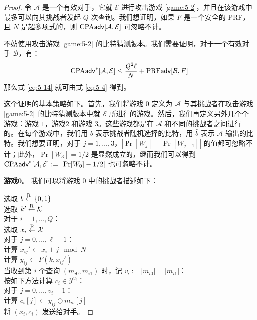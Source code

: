 \begin{proof}
令 $\mathcal{A}$ 是一个有效对手，它就 $\mathcal{E}$ 进行攻击游戏 \ref{game:5-2}，并且在该游戏中最多可以向其挑战者发起 $Q$ 次查询。我们想证明，如果 $F$ 是一个安全的 PRF，且 $N$ 是超多项式的，则 ${\rm CPA}\mathsf{adv}[\mathcal{A},\mathcal{E}]$ 可忽略不计。

不妨使用攻击游戏 \ref{game:5-2} 的比特猜测版本。我们需要证明，对于一个有效对手 $\mathcal{B}$，有：
\begin{equation}\label{eq:5-15}
{\rm CPA}\mathsf{adv}^*[\mathcal{A}, \mathcal{E}]\leq\frac{Q^2\ell}{N}+{\rm PRF\mathsf{adv}}[\mathcal{B},F]
\end{equation}
那么式 \ref{eq:5-14} 就可由式 \ref{eq:5-4} 得到。

这个证明的基本策略如下。首先，我们将游戏 $0$ 定义为 $\mathcal{A}$ 与其挑战者在攻击游戏 \ref{game:5-2} 的比特猜测版本中就 $\mathcal{E}$ 所进行的游戏。然后，我们再定义另外几个个游戏：游戏 $1$，游戏$2$ 和游戏 $3$。这些游戏都是在 $\mathcal{A}$ 和不同的挑战者之间进行的。在每个游戏中，我们用 $b$ 表示挑战者随机选择的比特，用 $\hat b$ 表示 $\mathcal{A}$ 输出的比特。我们想要证明，对于 $j = 1,\dots,3$，$|\Pr[W_j]-\Pr[W_{j-1}]|$ 的值都可忽略不计；此外，$\Pr[W_3]={1}/{2}$ 是显然成立的，继而我们可以得到 ${\rm CPA}\mathsf{adv}^*[\mathcal{A}, \mathcal{E}]:=|\Pr[W_0]-{1}/{2}|$ 也可忽略不计。

\vspace{5pt}

\noindent\textbf{游戏$\mathbf{0}$}。
我们可以将游戏 $0$ 中的挑战者描述如下：

\vspace{5pt}

\hspace*{5pt} 选取 $b\overset{\rm R}\leftarrow\{0,1\}$\\
\hspace*{26pt} 选取 $k'\overset{\rm R}\leftarrow\mathcal{K}$\\
\hspace*{26pt} 对于 $i=1,\dots,Q$：\\
\hspace*{50pt} 选取 $x_i\overset{\rm R}\leftarrow\mathcal{X}$\\
\hspace*{50pt} 对于 $j=0,\dots,\ell-1$：\\
\hspace*{75pt} 计算 $x_{ij}'\leftarrow x_i+j\mod N$\\
\hspace*{75pt} 计算 $y_{ij}\leftarrow F(k,x_{ij}')$\\
\hspace*{26pt} 当收到第 $i$ 个查询 $(m_{i0},m_{i1})$ 时，记 $v_i:=|m_{i0}|=|m_{i1}|$：\\
\hspace*{50pt} 按如下方法计算 $c_i\in\mathcal{Y}^{v_i}$：\\
\hspace*{75pt} 对于 $j=0,\dots,v_i-1$：\\
\hspace*{100pt} 计算 $c_i[j]\leftarrow y_{ij}\oplus m_{ib}[j]$\\
\hspace*{50pt} 将 $(x_i,c_i)$ 发送给对手。


\end{proof}

